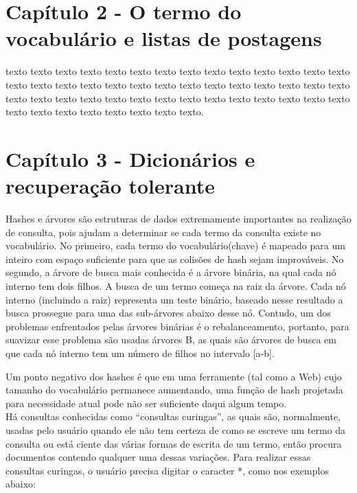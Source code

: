 \section{Capítulo 2 - O termo do vocabulário e listas de postagens}
\label{sec:lista_postagens}

texto texto texto texto texto texto texto texto
texto texto texto texto texto texto texto texto texto texto texto texto texto
texto texto texto texto texto texto texto texto texto texto texto texto texto
texto texto texto texto texto texto texto texto texto texto texto texto texto
texto texto texto.

\section{Capítulo 3 - Dicionários e recuperação tolerante}
\label{sec:dicionarios}

  Hashes e árvores são estruturas de dados extremamente importantes na realização de consulta, pois ajudam a determinar se cada termo da consulta existe no vocabulário. No primeiro, cada termo do vocabulário(chave) é mapeado para um inteiro com espaço suficiente para que as colisões de hash sejam improváveis. No segundo, a árvore de busca mais conhecida é a árvore binária, na qual cada nó interno tem dois filhos. A busca de um termo começa na raiz da árvore. Cada nó interno (incluindo a raiz) representa um teste binário, baseado nesse resultado a busca prossegue para uma das sub-árvores abaixo desse nó. Contudo, um dos problemas enfrentados pelas árvores binárias é o rebalanceamento, portanto, para suavizar esse problema são usadas árvores B, as quais são árvores de busca em que cada nó interno tem um número de filhos no intervalo [a-b].
   
  Um ponto negativo dos hashes é que em uma ferramente (tal como a Web) cujo tamanho do vocabulário permanece aumentando, uma função de hash projetada para necessidade atual pode não ser suficiente daqui algum tempo. \\
  
  Há consultas conhecidas como “consultas curingas”, as quais são, normalmente, usadas pelo usuário quando ele não tem certeza de como se escreve um termo da consulta ou está ciente das várias formas de escrita de um termo, então procura documentos contendo qualquer uma dessas variações. Para realizar essas consultas curingas, o usuário precisa digitar o caracter *, como nos exemplos abaixo: \\
    
